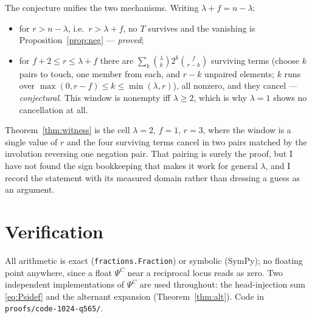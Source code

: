 \documentclass[11pt]{article}
\theoremstyle{definition}
\theoremstyle{remark}
\newcommand{\PsiC}{\Psi^{C}}
\begin{document}
The conjecture unifies the two mechanisms. Writing $\lambda+f=n-\lambda$:
\begin{itemize}
\item for $r>n-\lambda$, i.e.\ $r>\lambda+f$, no $T$ survives and the vanishing
  is Proposition~\ref{prop:neg} --- \emph{proved};
\item for $f+2\le r\le\lambda+f$ there are
  $\sum_{k}\binom{\lambda}{k}2^{k}\binom{f}{r-k}$ surviving terms (choose $k$
  pairs to touch, one member from each, and $r-k$ unpaired elements; $k$ runs over
  $\max(0,r-f)\le k\le\min(\lambda,r)$), all nonzero, and they cancel ---
  \emph{conjectural}. This
  window is nonempty iff $\lambda\ge2$, which is why $\lambda=1$ shows no
  cancellation at all.
\end{itemize}
Theorem~\ref{thm:witness} is the cell $\lambda=2$, $f=1$, $r=3$, where the window
is a single value of $r$ and the four surviving terms cancel in two pairs matched
by the involution reversing one negation pair. That pairing is surely the proof,
but I have not found the sign bookkeeping that makes it work for general
$\lambda$, and I record the statement with its measured domain rather than
dressing a guess as an argument.

\section{Verification}\label{sec:verif}

All arithmetic is exact (\texttt{fractions.Fraction}) or symbolic (SymPy); no
floating point anywhere, since a float $\PsiC$ near a reciprocal locus reads as
zero. Two independent implementations of $\PsiC$ are used throughout: the
head-injection sum \eqref{eq:Psidef} and the alternant expansion
(Theorem~\ref{thm:alt}). Code in \texttt{proofs/code-1024-q565/}.
\end{document}
